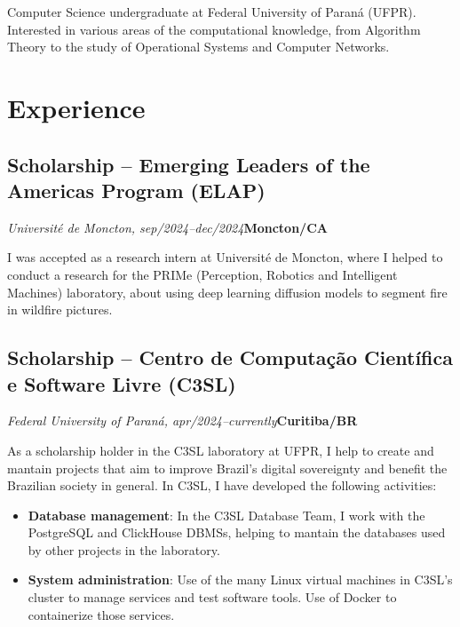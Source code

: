 \documentclass[a4paper, 12pt]{moderncv}
\begin{document}
\makecvtitle

\small{Computer Science undergraduate at Federal University of Paraná (UFPR).
Interested in various areas of the computational knowledge, from Algorithm
Theory to the study of Operational Systems and Computer Networks.}

\section{Experience}
\vspace{1pt}
\subsection{\small{Scholarship -- Emerging Leaders of the Americas Program (ELAP)}}
\textit{Université de Moncton, sep/2024--dec/2024}\hspace{190pt}\textbf{Moncton/CA}

\vspace{3pt}
I was accepted as a research intern at Université de Moncton, where I helped to
conduct a research for the PRIMe (Perception, Robotics and Intelligent
Machines) laboratory, about using deep learning diffusion models to segment
fire in wildfire pictures.
\vspace{4pt}

\subsection{\small{Scholarship -- Centro de Computação Científica e Software Livre (C3SL)}}
\textit{Federal University of Paraná, apr/2024--currently}\hspace{175pt}\textbf{Curitiba/BR}

\vspace{3pt}
As a scholarship holder in the C3SL laboratory at UFPR, I help to create and
mantain projects that aim to improve Brazil's digital sovereignty and benefit
the Brazilian society in general. In C3SL, I have developed the following
activities:
\vspace{4pt}
\begin{itemize}
    \item{\textbf{Database management}: In the C3SL Database Team, I work with the PostgreSQL and ClickHouse DBMSs, helping to mantain the databases used by other projects in the laboratory.}
    \item{\textbf{System administration}: Use of the many Linux virtual machines in C3SL's cluster to manage services and test software tools. Use of Docker to containerize those services.}
\end{itemize}
\vspace{4pt}
\end{document}
